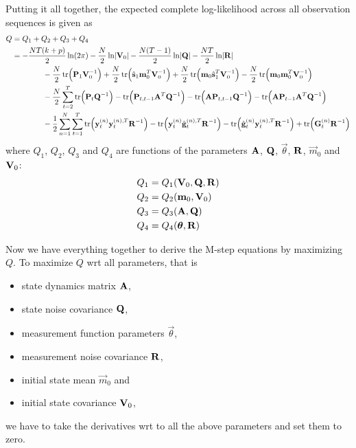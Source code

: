 		Putting it all together, the expected complete log-likelihood across all observation sequences is given as
		\begin{align*}
			Q
				&= Q_1 + Q_2 + Q_3 + Q_4 \\
				&= -\frac{NT(k + p)}{2} \ln(2\pi) - \frac{N}{2} \ln \lvert \mat{V}_0 \rvert - \frac{N(T - 1)}{2} \ln \lvert \mat{Q} \rvert - \frac{NT}{2} \ln \lvert \mat{R} \rvert \\
				&\qquad\qquad -\frac{N}{2} \tr\!\Big( \mat{P}_1 \mat{V}_0^{-1} \Big) + \frac{N}{2} \tr\!\Big( \hat{\vec{s}}_1 \vec{m}_0^T \mat{V}_0^{-1} \Big) + \frac{N}{2} \tr\!\Big( \vec{m}_0 \hat{\vec{s}}_1^T \mat{V}_0^{-1} \Big) - \frac{N}{2} \tr\!\Big(\vec{m}_0 \vec{m}_0^T \mat{V}_0^{-1} \Big) \\
				&\qquad\qquad -\frac{N}{2} \sum_{t = 2}^{T} \tr\!\Big( \mat{P}_t \mat{Q}^{-1} \Big) - \tr\!\Big( \mat{P}_{t, t - 1} \mat{A}^T \mat{Q}^{-1} \Big) - \tr\!\Big( \mat{A} \mat{P}_{t, t - 1} \mat{Q}^{-1} \Big) - \tr\!\Big( \mat{A} \mat{P}_{t - 1} \mat{A}^T \mat{Q}^{-1} \Big) \\
				&\qquad\qquad -\frac{1}{2} \sum_{n = 1}^{N} \sum_{t = 1}^{T} \tr\!\Big( \vec{y}_t^{(n)} \vec{y}_t^{(n), T} \mat{R}^{-1} \Big) - \tr\!\Big( \vec{y}_t^{(n)} \hat{\vec{g}}_t^{(n), T} \mat{R}^{-1} \Big) - \tr\!\Big( \hat{\vec{g}}_t^{(n)} \vec{y}_t^{(n), T} \mat{R}^{-1} \Big) + \tr\!\Big( \mat{G}_t^{(n)} \mat{R}^{-1} \Big)
		\end{align*}
		where \( Q_1 \), \( Q_2 \), \( Q_3 \) and \( Q_4 \) are functions of the parameters \( \boldsymbol{\mathrm{A}} \), \( \boldsymbol{\mathrm{Q}} \), \( \vec{\theta} \), \( \boldsymbol{\mathrm{R}} \), \( \vec{m}_0 \) and \( \boldsymbol{\mathrm{V}}_0 \):
		\begin{align*}
			Q_1 &= Q_1(\boldsymbol{\mathrm{V}}_0, \boldsymbol{\mathrm{Q}}, \boldsymbol{\mathrm{R}}) \\
			Q_2 &= Q_2(\boldsymbol{\mathrm{m}}_0, \boldsymbol{\mathrm{V}}_0) \\
			Q_3 &= Q_3(\boldsymbol{\mathrm{A}}, \boldsymbol{\mathrm{Q}}) \\
			Q_4 &= Q_4(\boldsymbol{\mathrm{\theta}}, \boldsymbol{\mathrm{R}})
		\end{align*}

		Now we have everything together to derive the M-step equations by maximizing \(Q\). To maximize \(Q\) \ac{wrt} all parameters, that is
		\begin{itemize}
			\item state dynamics matrix \(\boldsymbol{\mathrm{A}}\),
			\item state noise covariance \(\boldsymbol{\mathrm{Q}}\),
			\item measurement function parameters \(\vec{\theta}\),
			\item measurement noise covariance \(\boldsymbol{\mathrm{R}}\),
			\item initial state mean \(\vec{m}_0\) and
			\item initial state covariance \(\boldsymbol{\mathrm{V}}_0\),
		\end{itemize}
		we have to take the derivatives \ac{wrt} to all the above parameters and set them to zero.

